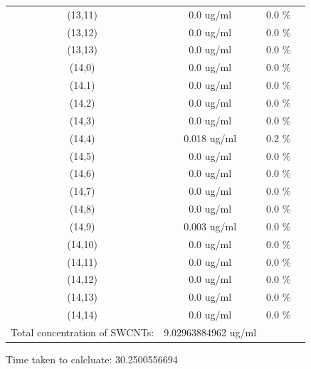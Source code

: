 \documentclass{article}
\begin{document}
\begin{tabular}{c c c c}
(13,11)&        0.0 ug/ml        &0.0 \%\\
(13,12)&        0.0 ug/ml        &0.0 \%\\
(13,13)&        0.0 ug/ml        &0.0 \%\\
(14,0)&        0.0 ug/ml        &0.0 \%\\
(14,1)&        0.0 ug/ml        &0.0 \%\\
(14,2)&        0.0 ug/ml        &0.0 \%\\
(14,3)&        0.0 ug/ml        &0.0 \%\\
(14,4)&        0.018 ug/ml        &0.2 \%\\
(14,5)&        0.0 ug/ml        &0.0 \%\\
(14,6)&        0.0 ug/ml        &0.0 \%\\
(14,7)&        0.0 ug/ml        &0.0 \%\\
(14,8)&        0.0 ug/ml        &0.0 \%\\
(14,9)&        0.003 ug/ml        &0.0 \%\\
(14,10)&        0.0 ug/ml        &0.0 \%\\
(14,11)&        0.0 ug/ml        &0.0 \%\\
(14,12)&        0.0 ug/ml        &0.0 \%\\
(14,13)&        0.0 ug/ml        &0.0 \%\\
(14,14)&        0.0 ug/ml        &0.0 \%\\
Total concentration of SWCNTs: &9.02963884962 ug/ml\\

\end{tabular}Time taken to calcluate: 30.2500556694
\end{document}
